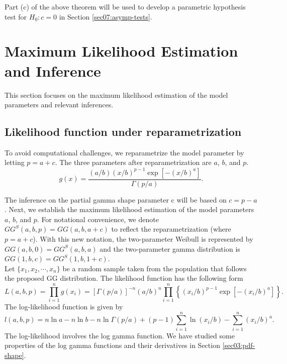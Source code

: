 \documentclass{ps}
\theoremstyle{plain}%
\theoremstyle{definition}
\theoremstyle{remark}
\begin{document}
Part (c) of the above theorem will be used to develop a parametric hypothesis test for $H_0: c = 0$ in Section \ref{sec07:asymp-tests}.


\section{Maximum Likelihood Estimation and Inference}\label{sec06:MLE}

This section focuses on the maximum likelihood estimation of the model parameters and relevant inferences.

\subsection{Likelihood function under reparametrization}\label{sec6.1: reparametrization}

To avoid computational challenges, we reparametrize the model parameter by letting $p = a + c$.  The three parameters after reparametrization are $a$, $b$, and $p$. 
\begin{equation}\label{reparametrization}
	g(x)=\frac{(a/b)(x/b)^{p-1}\exp[-(x/b)^a]}{\Gamma(p/a)}.
\end{equation}

The inference on the partial gamma shape parameter c will be based on $c = p-a$.  Next, we establish the maximum likelihood estimation of the model parameters $a$, $b$, and $p$.  For notational convenience, we denote $GG^S(a,b,p) = GG(a, b, a+c)$ to reflect the reparametrization (where $p = a + c$). With this new notation, the two-parameter Weibull is represented by $GG(a, b, 0) = GG^S(a, b, a)$ and the two-parameter gamma distribution is  $GG(1, b, c) = GG^S(1, b, 1+c)$.\\

Let $\{x_1, x_2, \cdots, x_n \}$ be a random sample taken from the population that follows the proposed GG distribution. The likelihood function has the following form
\begin{equation}\label{likelihood-fun}
	L(a,b,p) = \prod_{i=1}^n g(x_i)=\left[\Gamma(p/a) \right]^{-n} (a/b)^n\prod_{i=1}^n\left\{
	(x_i/b)^{p-1}\exp\left[- (x_i/b)^a\right]\right\}.
\end{equation}
The log-likelihood function is given by
\begin{equation}\label{log-likelihood-fun}
	l(a,b,p) = n\ln a -n\ln b -n\ln \Gamma(p/a) + (p-1)\sum_{i=1}^n \ln (x_i/b) -\sum_{i=1}^n (x_i/b)^a.
\end{equation}
The log-likelihood involves the log gamma function. We have studied some properties of the log gamma functions and their derivatives in Section \ref{sec03:pdf-shape}.
\end{document}
